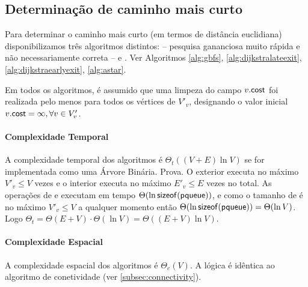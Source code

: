 \documentclass[relatorio.tex]{subfiles}
\begin{document}
\FloatBarrier
\subsection{Determinação de caminho mais curto}
\label{subsec:shortestpathalg}

Para determinar o caminho mais curto (em termos de distância euclidiana)
disponibilizamos três algoritmos distintos: 
-- pesquisa gananciosa muito rápida e não necessariamente correta --
 e . Ver Algoritmos \ref{alg:gbfs}, \ref{alg:dijkstralateexit},
\ref{alg:dijkstraearlyexit}, \ref{alg:astar}.

Em todos os algoritmos, é assumido que uma limpeza do campo $v.\sfmath{cost}$
foi realizada pelo menos para todos os vértices de $V'_v$,
designando o valor inicial $v.\sfmath{cost}=\infty, \forall v\in V'_v$.

\paragraph{Complexidade Temporal}
A complexidade temporal dos algoritmos é $\Theta_t((V + E)\ln V)$ se 
for implementada como uma Árvore Binária. Prova.
O  exterior executa no máximo $V'_v\leq V$ vezes e o 
interior executa no máximo $E'_v\leq E$ vezes no total. As operações de 
e  executam em tempo $\Theta(\ln \sizeof(\sfmath{pqueue}))$, e como o tamanho de
 é no máximo $V'_v\leq V$ a qualquer momento então $\Theta(\ln \sizeof(\sfmath{pqueue}))
=\Theta(\ln V)$. Logo $\Theta_t=\Theta(E+V)\cdot\Theta(\ln V)=\Theta((E+V)\ln V)$.

\paragraph{Complexidade Espacial}
A complexidade espacial dos algoritmos é $\Theta_e(V)$. A lógica é idêntica
ao algoritmo  de conetividade (ver \ref{subsec:connectivity}).
\end{document}
